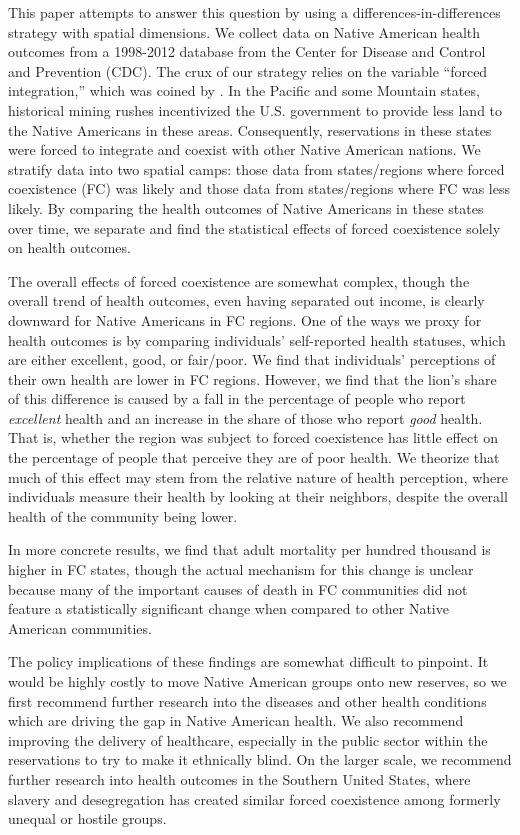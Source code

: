 \documentclass[12pt]{article}
\begin{document}
This paper attempts to answer this question by using a differences-in-differences strategy with spatial dimensions. 
We collect data on Native American health outcomes from a 1998-2012 database from the Center for Disease and Control and Prevention (CDC).
The crux of our strategy relies on the variable ``forced integration,'' which was coined by \cite{dippel2010forced}.
In the Pacific and some Mountain states, historical mining rushes incentivized the U.S. government to provide less land to the Native Americans in these areas. 
Consequently, reservations in these states were forced to integrate and coexist with other Native American nations. 
We stratify data into two spatial camps: those data from states/regions where forced coexistence (FC) was likely and those data from states/regions where FC was less likely.
By comparing the health outcomes of Native Americans in these states over time, we separate and find the statistical effects of forced coexistence solely on health outcomes.

The overall effects of forced coexistence are somewhat complex, though the overall trend of health outcomes, even having separated out income, is clearly downward for Native Americans in FC regions. 
One of the ways we proxy for health outcomes is by comparing individuals' self-reported health statuses, which are either excellent, good, or fair/poor.
We find that individuals' perceptions of their own health are lower in FC regions. 
However, we find that the lion's share of this difference is caused by a fall in the percentage of people who report \emph{excellent} health and an increase in the share of those who report \emph{good} health.
That is, whether the region was subject to forced coexistence has little effect on the percentage of people that perceive they are of poor health. 
We theorize that much of this effect may stem from the relative nature of health perception, where individuals measure their health by looking at their neighbors, despite the overall health of the community being lower.

In more concrete results, we find that adult mortality per hundred thousand is higher in FC states, though the actual mechanism for this change is unclear because many of the important causes of death in FC communities did not feature a statistically significant change when compared to other Native American communities.

The policy implications of these findings are somewhat difficult to pinpoint.  
It would be highly costly to move Native American groups onto new reserves, so we first recommend further research into the diseases and other health conditions which are driving the gap in Native American health. 
We also recommend improving the delivery of healthcare, especially in the public sector within the reservations to try to make it ethnically blind. 
On the larger scale, we recommend further research into health outcomes in the Southern United States, where slavery and desegregation has created similar forced coexistence among formerly unequal or hostile groups.  
\end{document}

